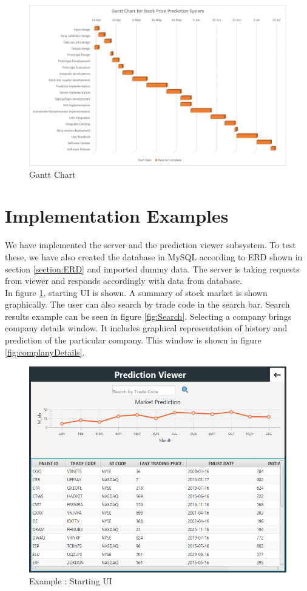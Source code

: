 \documentclass{article}[12pt]
\begin{document}
    
    \begin{figure}[!h]
        \centering
        \includegraphics[width=.9\textwidth]{Images/GanttChart.png}
        \caption{Gantt Chart}
    \end{figure}
    

\newpage
\section{Implementation Examples}
    We have implemented the server and the prediction viewer subsystem. To test these, we have also created the database in MySQL according to ERD shown in section \ref{section:ERD} and imported dummy data. The server is taking requests from viewer and responds accordingly with data from database.  \\
    
    In figure \ref{fig:UI}, starting UI is shown. A summary of stock market is shown graphically. The user can also search by trade code in the search bar. Search results example can be seen in figure \ref{fig:Search}. Selecting a company brings company details window. It includes graphical representation of history and prediction of the particular company. This window is shown in figure \ref{fig:complanyDetails}.
    
    \begin{figure}[!h]
        \centering
        \includegraphics[width=.9\textwidth]{Images/SS1_All.PNG}
        \caption{Example : Starting UI}
        \label{fig:UI}
    \end{figure}
    
\end{document}
